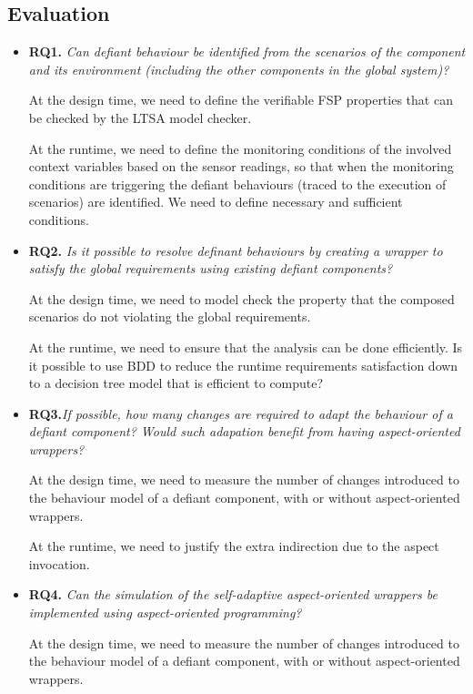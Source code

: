 \subsection{Evaluation}

\begin{itemize}
\item {\bf RQ1.} {\em Can defiant behaviour be identified from the scenarios of the component and its environment (including the  other components in the global system)? }

At the design time, we need to define the verifiable FSP properties that can be checked by the LTSA model checker.

At the runtime, we need to define the  monitoring conditions of the involved context variables based on the sensor readings, so that when the monitoring conditions are
triggering the defiant behaviours (traced to the execution of scenarios) are identified. We need to define necessary and sufficient conditions. 

\item {\bf RQ2.} {\em Is it possible to resolve definant behaviours by creating a wrapper to satisfy the global requirements using existing defiant components?}

At the design time, we need to model check the property that the composed scenarios do not violating the global requirements.

At the runtime, we need to ensure that the analysis can be done efficiently. Is it possible to use BDD to reduce the runtime requirements satisfaction down to a decision tree model that is efficient to compute? 

\item {\bf RQ3.}{\em  If possible, how many changes are required to adapt the behaviour of a defiant component? Would such adapation benefit from having aspect-oriented wrappers?}

At the design time, we need to measure the number of changes introduced to the behaviour model of a defiant component, with or without aspect-oriented wrappers.

At the runtime, we need to justify the extra indirection due to the aspect invocation. 

\item {\bf RQ4.} {\em Can the simulation of the self-adaptive aspect-oriented wrappers be implemented using aspect-oriented programming?}

At the design time, we need to measure the number of changes introduced to the behaviour model of a defiant component, with or without aspect-oriented wrappers.


\end{itemize}
